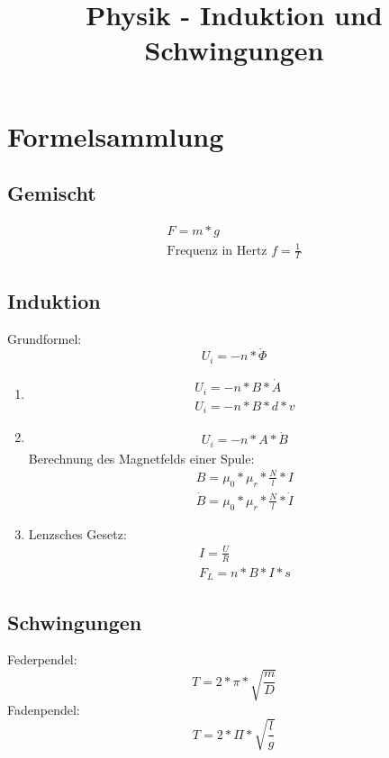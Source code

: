 \documentclass{article}
\title{Physik - Induktion und Schwingungen}
\begin{document}
\maketitle

\section*{Formelsammlung}
\subsection*{Gemischt}
\begin{gather*}
    F = m * g\\
    \text{Frequenz in Hertz } f= \frac{1}{T}
\end{gather*}
\subsection*{Induktion}
Grundformel:
\begin{equation*}
    U_i = -n * \dot{\Phi}
\end{equation*}

\begin{enumerate}
    \item \begin{gather*}
              U_i = -n * B * \dot{A}\\
              U_i = -n * B * d * v
          \end{gather*}
    \item \begin{gather*}
              U_i = -n * A * \dot{B}
          \end{gather*}
          Berechnung des Magnetfelds einer Spule:
          \begin{gather*}
              B = \mu_0 * \mu_r * \frac{N}{l} * I\\
              \dot{B} = \mu_0 * \mu_r * \frac{N}{l} * \dot{I}
          \end{gather*}

    \item Lenzsches Gesetz:
          \begin{gather*}
              I = \frac{U}{R}\\
              F_L = n * B * I * s
          \end{gather*}
\end{enumerate}

\subsection*{Schwingungen}
Federpendel:
\begin{equation*}
    T = 2 * \pi * \sqrt{\frac{m}{D}}
\end{equation*}
Fadenpendel:
\begin{equation*}
    T = 2 * \Pi * \sqrt{\frac{l}{g}}
\end{equation*}
\end{document}
